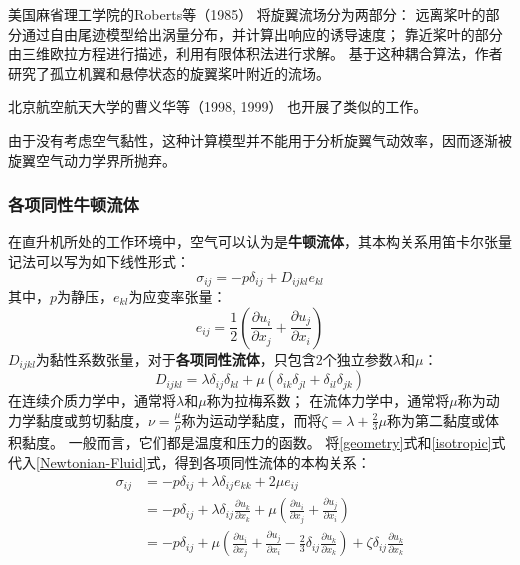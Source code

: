 美国麻省理工学院的Roberts等（1985）
将旋翼流场分为两部分：
远离桨叶的部分通过自由尾迹模型给出涡量分布，并计算出响应的诱导速度；
靠近桨叶的部分由三维欧拉方程进行描述，利用有限体积法进行求解。
基于这种耦合算法，作者研究了孤立机翼和悬停状态的旋翼桨叶附近的流场。

北京航空航天大学的曹义华等（1998, 1999）
也开展了类似的工作。

由于没有考虑空气黏性，这种计算模型并不能用于分析旋翼气动效率，因而逐渐被旋翼空气动力学界所抛弃。

\subsubsection{各项同性牛顿流体}
在直升机所处的工作环境中，空气可以认为是\textbf{牛顿流体}，其本构关系用笛卡尔张量记法可以写为如下线性形式：
\begin{equation}\label{Newtonian-Fluid}
\sigma_{ij}
=
-p\delta_{ij}
+
{D}_{ijkl} e_{kl}
\end{equation}
其中，$p$为静压，$e_{kl}$为应变率张量：
\begin{equation}\label{geometry}
e_{ij}
=
\frac{1}{2}
\left(
\frac{\partial u_i}{\partial x_j}
+
\frac{\partial u_j}{\partial x_i}
\right)
\end{equation}
${D}_{ijkl}$为黏性系数张量，对于\textbf{各项同性流体}，只包含$2$个独立参数$\lambda$和$\mu$：
\begin{equation}\label{isotropic}
{D}_{ijkl}
=
\lambda \delta_{ij} \delta_{kl}
+
\mu \left( \delta_{ik} \delta_{jl} + \delta_{il} \delta_{jk} \right)
\end{equation}
在连续介质力学中，通常将$\lambda$和$\mu$称为拉梅系数；
在流体力学中，通常将$\mu$称为动力学黏度或剪切黏度，$\nu=\frac{\mu}{\rho}$称为运动学黏度，而将$\zeta=\lambda+\frac{2}{3}\mu$称为第二黏度或体积黏度。
一般而言，它们都是温度和压力的函数。
将\ref{geometry}式和\ref{isotropic}式代入\ref{Newtonian-Fluid}式，得到各项同性流体的本构关系：
\begin{equation}\label{Isotropic-Fluid}
\begin{split}
\sigma_{ij}
& = -p\delta_{ij} +\lambda \delta_{ij} e_{kk} +2\mu  e_{ij} \\
& = -p\delta_{ij} + \lambda \delta_{ij} \frac{\partial u_k}{\partial x_k}
                            + \mu \left( \frac{\partial u_i}{\partial x_j} + \frac{\partial u_j}{\partial x_i} \right) \\
& = -p\delta_{ij} + \mu \left( \frac{\partial u_i}{\partial x_j} + \frac{\partial u_j}{\partial x_i} - \frac{2}{3} \delta_{ij} \frac{\partial u_k}{\partial x_k} \right)
                            + \zeta \delta_{ij} \frac{\partial u_k}{\partial x_k}
\end{split}
\end{equation}
